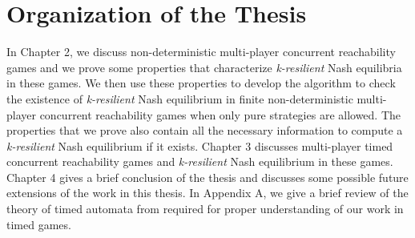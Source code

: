 \section{Organization of the Thesis}

In Chapter 2, we discuss non-deterministic multi-player concurrent reachability games and we prove some properties that characterize \textit{k-resilient} Nash equilibria in these games. We then use these properties to develop the algorithm to check the existence of \textit{k-resilient} Nash equilibrium in finite non-deterministic multi-player concurrent reachability games when only pure strategies are allowed. The properties that we prove also contain all the necessary information to compute a \textit{k-resilient} Nash equilibrium if it exists. Chapter 3 discusses multi-player timed concurrent reachability games and \textit{k-resilient} Nash equilibrium in these games. Chapter 4 gives a brief conclusion of the thesis and discusses some possible future extensions of the work in this thesis. In Appendix A, we give a brief review of the theory of timed automata from \cite{1} required for proper understanding of our work in timed games.